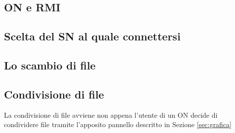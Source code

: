 \subsection{ON e RMI}

\subsection{Scelta del SN al quale connettersi}\label{sec:scelta_sn}
\subsection{Lo scambio di file}\label{sec:scambio}
\subsection{Condivisione di file}
La condivisione di file avviene non appena l'utente di un ON decide di condividere file tramite l'apposito pannello descritto in Sezione \ref{sec:grafica}
